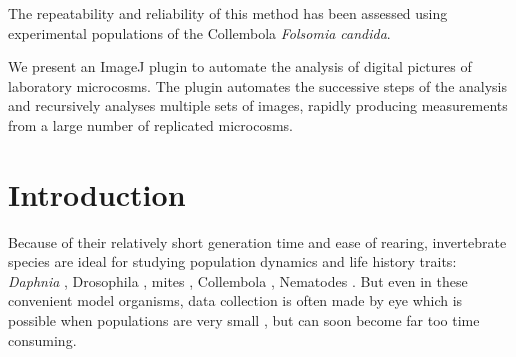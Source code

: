 The repeatability and reliability of this method has been assessed using
experimental populations of the Collembola \textit{Folsomia candida}.

We present an ImageJ plugin to automate the analysis of digital pictures of
laboratory microcosms. The plugin automates the successive steps of the analysis
and recursively analyses multiple sets of images, rapidly producing measurements
from a large number of replicated microcosms.

\section{Introduction}

Because of their relatively short generation time and ease of rearing,
invertebrate species are ideal for studying population dynamics and life history
traits: \textit{Daphnia} \autocites{drake2009a,hebert1978a}, Drosophila
\autocites{mueller2005a}, mites \autocites{benton2005a}, Collembola
\autocites{tully2008a,pike2004a}, Nematodes \autocites{alvarez2005a,chen2001a}.
But even in these convenient model organisms, data collection is often made by
eye which is possible when populations are very small
\autocites{pike2004a,drake2004a}, but can soon become far too time consuming.

